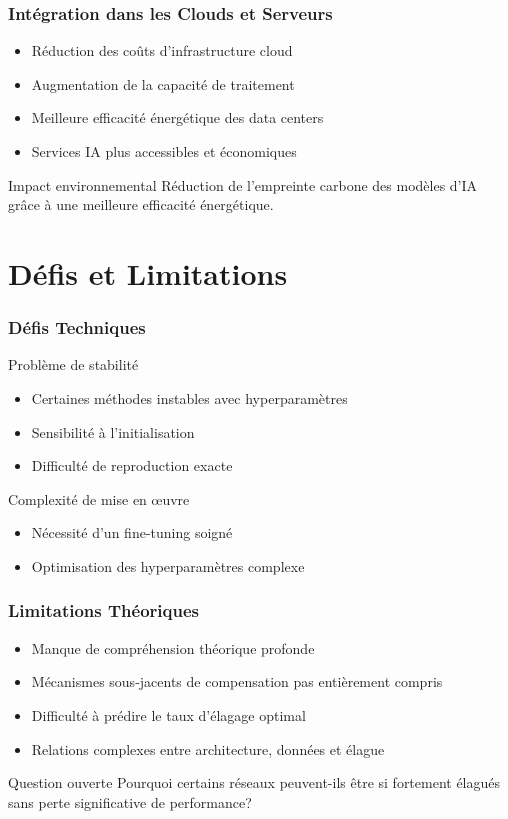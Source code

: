 \documentclass[10pt]{beamer}
\begin{document}
\begin{frame}
\frametitle{Intégration dans les Clouds et Serveurs}
\begin{itemize}
    \item Réduction des coûts d'infrastructure cloud
    \item Augmentation de la capacité de traitement
    \item Meilleure efficacité énergétique des data centers
    \item Services IA plus accessibles et économiques
\end{itemize}

\begin{block}{Impact environnemental}
Réduction de l'empreinte carbone des modèles d'IA grâce à une meilleure efficacité énergétique.
\end{block}
\end{frame}

\section{Défis et Limitations}

\begin{frame}
\frametitle{Défis Techniques}
\begin{alertblock}{Problème de stabilité}
\begin{itemize}
    \item Certaines méthodes instables avec hyperparamètres
    \item Sensibilité à l'initialisation
    \item Difficulté de reproduction exacte
\end{itemize}
\end{alertblock}

\begin{alertblock}{Complexité de mise en œuvre}
\begin{itemize}
    \item Nécessité d'un fine-tuning soigné
    \item Optimisation des hyperparamètres complexe
\end{itemize}
\end{alertblock}
\end{frame}

\begin{frame}
\frametitle{Limitations Théoriques}
\begin{itemize}
    \item Manque de compréhension théorique profonde
    \item Mécanismes sous-jacents de compensation pas entièrement compris
    \item Difficulté à prédire le taux d'élagage optimal
    \item Relations complexes entre architecture, données et élague
\end{itemize}

\begin{block}{Question ouverte}
Pourquoi certains réseaux peuvent-ils être si fortement élagués sans perte significative de performance?
\end{block}
\end{frame}
\end{document}
